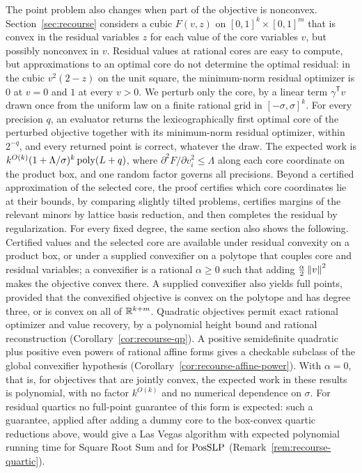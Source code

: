 The point problem also changes when part of the objective is nonconvex.
Section~\ref{sec:recourse} considers a cubic $F(v,z)$ on
$[0,1]^k\times[0,1]^m$ that is convex in the residual variables $z$ for each
value of the core variables $v$, but possibly nonconvex in $v$. Residual
values at rational cores are easy to compute, but approximations to an
optimal core do not determine the optimal residual: in the cubic
$v^2(2-z)$ on the unit square, the minimum-norm residual optimizer is $0$ at
$v=0$ and $1$ at every $v>0$. We perturb only the core, by a linear term
$\gamma^{\mathsf T}v$ drawn once from the uniform law on a finite rational
grid in $[-\sigma,\sigma]^k$. For every precision $q$, an evaluator returns
the lexicographically first optimal core of the perturbed objective together
with its minimum-norm residual optimizer, within $2^{-q}$, and every returned
point is correct, whatever the draw. The expected work is
$k^{O(k)}(1+\Lambda/\sigma)^k\operatorname{poly}(L+q)$, where
$\partial^2F/\partial v_i^2\le\Lambda$ along each core coordinate on the
product box, and one
random factor governs all precisions. Beyond a certified approximation of the
selected core, the proof certifies which core coordinates lie at their
bounds, by comparing slightly tilted problems, certifies margins of the
relevant minors by lattice basis reduction, and then completes the residual
by regularization. For every fixed degree, the same section also shows the
following. Certified values and the selected core are available under
residual convexity on a product box, or under a supplied convexifier on a
polytope that couples core and residual variables; a convexifier is a
rational $\alpha\ge0$ such that adding $\frac\alpha2\left\lVert v\right\rVert^2$ makes the
objective convex there. A supplied convexifier also yields full points,
provided that the convexified objective is convex on the polytope and has
degree three, or is convex on all of $\mathbb R^{k+m}$. Quadratic objectives permit
exact rational optimizer and value recovery, by a polynomial height bound
and rational reconstruction (Corollary~\ref{cor:recourse-qp}). A positive
semidefinite quadratic plus positive even powers of rational affine forms
gives a checkable subclass of the global convexifier hypothesis
(Corollary~\ref{cor:recourse-affine-power}). With $\alpha=0$, that is,
for objectives that are jointly convex, the expected work in these results is
polynomial, with no factor $k^{O(k)}$ and no numerical dependence on $\sigma$.
For residual quartics no full-point guarantee of this form is expected:
such a guarantee, applied after adding a dummy core to the box-convex quartic
reductions above, would give a Las Vegas algorithm with expected polynomial
running time for Square Root Sum and for $\mathrm{PosSLP}$
(Remark~\ref{rem:recourse-quartic}).

